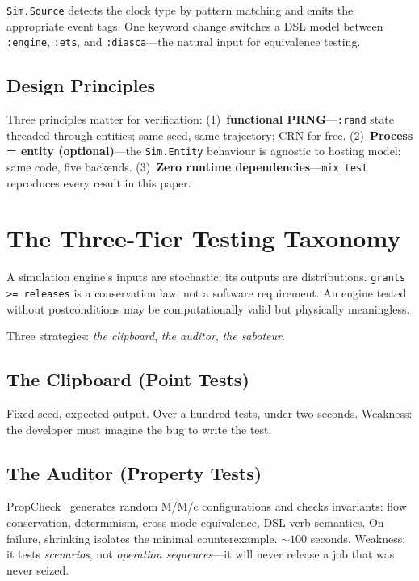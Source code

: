 \documentclass[sigplan,review,anonymous=false]{acmart}
\begin{document}
\texttt{Sim.Source} detects the clock type by pattern matching and emits
the appropriate event tags. One keyword change switches a DSL model
between \texttt{:engine}, \texttt{:ets}, and \texttt{:diasca}---the
natural input for equivalence testing.

\subsection{Design Principles}

Three principles matter for verification: (1)~\textbf{functional
PRNG}---\texttt{:rand} state threaded through entities; same seed, same
trajectory; CRN for free. (2)~\textbf{Process = entity
(optional)}---the \texttt{Sim.Entity} behaviour is agnostic to hosting
model; same code, five backends. (3)~\textbf{Zero runtime
dependencies}---\texttt{mix test} reproduces every result in this paper.


\section{The Three-Tier Testing Taxonomy}

A simulation engine's inputs are stochastic; its outputs are
distributions. \texttt{grants >= releases} is a conservation law, not a
software requirement. An engine tested without postconditions may be
computationally valid but physically meaningless.

Three strategies: \emph{the clipboard}, \emph{the auditor}, \emph{the
saboteur}.

\subsection{The Clipboard (Point Tests)}

Fixed seed, expected output. Over a hundred tests, under two seconds.
Weakness: the developer must imagine the bug to write the test.

\subsection{The Auditor (Property Tests)}

PropCheck~\cite{alfert2019} generates random M/M/c configurations and
checks invariants: flow conservation, determinism, cross-mode
equivalence, DSL verb semantics. On failure, shrinking isolates the
minimal counterexample. ${\sim}100$ seconds. Weakness: it tests
\emph{scenarios}, not \emph{operation sequences}---it will never release
a job that was never seized.
\end{document}
